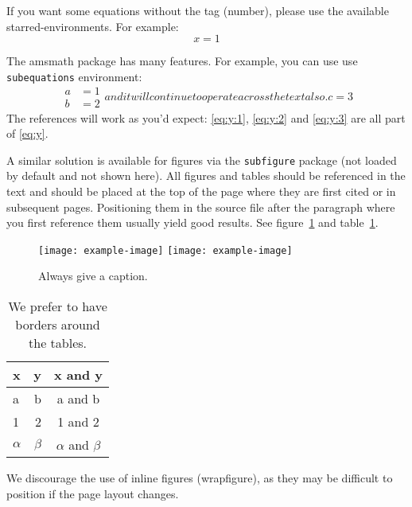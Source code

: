 \documentclass[a4paper,11pt]{article}
\begin{document}
If you want some equations without the tag (number), please use the available
starred-environments. For example:
\begin{equation*}
x = 1
\end{equation*}

The amsmath package has many features. For example, you can use use
\texttt{subequations} environment:
\begin{subequations}\label{eq:y}
\begin{align}
\label{eq:y:1}
a & = 1
\\
\label{eq:y:2}
b & = 2
\end{align}
and it will continue to operate across the text also.
\begin{equation}
\label{eq:y:3}
c = 3
\end{equation}
\end{subequations}
The references will work as you'd expect: \eqref{eq:y:1},
\eqref{eq:y:2} and \eqref{eq:y:3} are all part of \eqref{eq:y}.

A similar solution is available for figures via the \texttt{subfigure}
package (not loaded by default and not shown here).
All figures and tables should be referenced in the text and should be
placed at the top of the page where they are first cited or in
subsequent pages. Positioning them in the source file
after the paragraph where you first reference them usually yield good
results. See figure~\ref{fig:i} and table~\ref{tab:i}.

\begin{figure}[tbp]
\centering 
\texttt{[image: example-image]}
\hfill
\texttt{[image: example-image]}
\caption{\label{fig:i} Always give a caption.}
\end{figure}

\begin{table}[tbp]
\centering
\begin{tabular}{|lr|c|}
\hline
x&y&x and y\\
\hline
a & b & a and b\\
1 & 2 & 1 and 2\\
$\alpha$ & $\beta$ & $\alpha$ and $\beta$\\
\hline
\end{tabular}
\caption{\label{tab:i} We prefer to have borders around the tables.}
\end{table}

We discourage the use of inline figures (wrapfigure), as they may be
difficult to position if the page layout changes.
\end{document}
